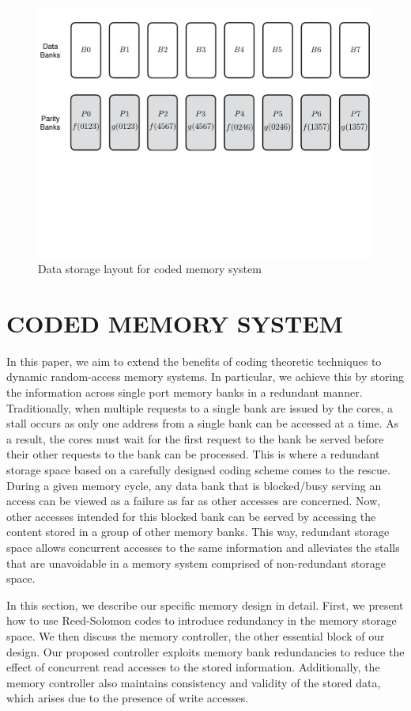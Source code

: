 \begin{figure}[t!] \centering
\includegraphics[width=0.7\linewidth]{figures/Code-Design.pdf} 
\caption{Data storage layout for coded memory system}
\label{fig:memsys}
\end{figure}


\section{CODED MEMORY SYSTEM}
\label{sec:codingArchitecture}

In this paper, we aim to extend the benefits of coding theoretic techniques to dynamic random-access memory systems. In particular, we achieve this by storing the information across single port memory banks in a redundant manner. Traditionally, when multiple requests to a single bank are issued by the cores, a stall occurs as only one address from a single bank can be accessed at a time. As a result, the cores must wait for the first request to the bank be served before their other requests to the bank can be processed. This is where a redundant storage space based on a carefully designed coding scheme comes to the rescue. During a given memory cycle, any data bank that is blocked/busy serving an access can be viewed as a failure as far as other accesses are concerned. Now, other accesses intended for this blocked bank can be served by accessing the content stored in a group of other memory banks. This way, redundant storage space allows concurrent accesses to the same information and alleviates the stalls that are unavoidable in a memory system comprised of non-redundant storage space. 

In this section, we describe our specific memory design in detail. First, we present how to use Reed-Solomon codes to introduce redundancy in the memory storage space. We then discuss the memory controller, the other essential block of our design. Our proposed controller exploits memory bank redundancies to reduce the effect of concurrent read accesses to the stored information. Additionally, the memory controller also maintains consistency and validity of the stored data, which arises due to the presence of write accesses. 




